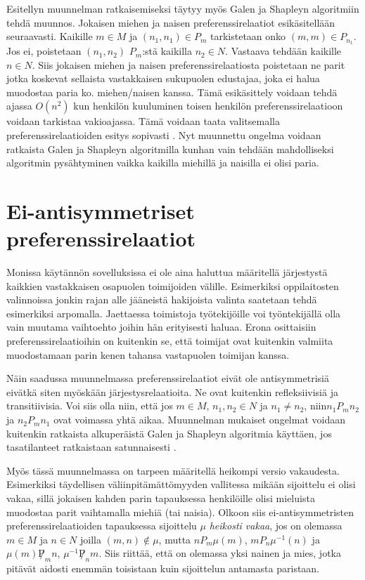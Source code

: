 \documentclass[gradu, twoside]{tktltiki}
\begin{document}
Esitellyn muunnelman ratkaisemiseksi täytyy myös Galen ja Shapleyn
algoritmiin tehdä muunnos. Jokaisen miehen ja naisen
preferenssirelaatiot esikäsitellään seuraavasti. Kaikille $m \in M$ ja
$(n_1, n_1) \in P_m$ tarkistetaan onko $(m, m) \in P_{n_1}$. Jos ei,
poistetaan $(n_1, n_2)$ $P_m$:stä kaikilla $n_2 \in N$. Vastaava
tehdään kaikille $n \in N$. Siis jokaisen miehen ja naisen
preferenssirelaatiosta poistetaan ne parit jotka koskevat sellaista
vastakkaisen sukupuolen edustajaa, joka ei halua muodostaa paria ko.
miehen/naisen kanssa. Tämä esikäsittely voidaan tehdä ajassa $O(n^2)$
kun henkilön kuuluminen toisen henkilön preferenssirelaatioon voidaan
tarkistaa vakioajassa. Tämä voidaan taata valitsemalla
preferenssirelaatioiden esitys sopivasti \cite{gusfield89}. Nyt
muunnettu ongelma voidaan ratkaista Galen ja Shapleyn algoritmilla
kunhan vain tehdään mahdolliseksi algoritmin pysähtyminen vaikka
kaikilla miehillä ja naisilla ei olisi paria.

\section{Ei-antisymmetriset preferenssirelaatiot}

Monissa käytännön sovelluksissa ei ole aina haluttua määritellä
järjestystä kaikkien vastakkaisen osapuolen toimijoiden välille.
Esimerkiksi oppilaitosten valinnoissa jonkin rajan alle jääneistä
hakijoista valinta saatetaan tehdä esimerkiksi arpomalla. Jaettaessa
toimistoja työtekijöille voi työntekijällä olla vain muutama
vaihtoehto joihin hän erityisesti haluaa. Erona osittaisiin
preferenssirelaatioihin on kuitenkin se, että toimijat ovat kuitenkin
valmiita muodostamaan parin kenen tahansa vastapuolen toimijan kanssa.

Näin saadussa muunnelmassa preferenssirelaatiot eivät ole
antisymmetrisiä eivätkä siten myöskään järjestysrelaatioita. Ne ovat
kuitenkin refleksiivisiä ja transitiivisia. Voi siis olla niin, että
jos $m \in M$, $n_1,n_2 \in N$ ja $n_1 \neq n_2$, niin$n_1P_mn_2$ ja
$n_2P_mn_1$ ovat voimassa yhtä aikaa. Muunnelman mukaiset ongelmat
voidaan kuitenkin ratkaista alkuperäistä Galen ja Shapleyn algoritmia
käyttäen, jos tasatilanteet ratkaistaan satunnaisesti
\cite{gusfield89}.

Myös tässä muunnelmassa on tarpeen määritellä heikompi versio
vakaudesta. Esimerkiksi täydellisen väliinpitämättömyyden vallitessa
mikään sijoittelu ei olisi vakaa, sillä jokaisen kahden parin
tapauksessa henkilöille olisi mieluista muodostaa parit vaihtamalla
miehiä (tai naisia). Olkoon siis ei-antisymmetristen
preferenssirelaatioiden tapauksessa sijoittelu $\mu$ \emph{heikosti
  vakaa}, jos on olemassa $m \in M$ ja $n \in N$ joilla $(m, n) \notin
\mu$, mutta $nP_m\mu(m)$, $mP_n\mu^{-1}(n)$ ja $\mu(m)\not P_mn$,
$\mu^{-1}\not P_nm$. Siis riittää, että on olemassa yksi nainen ja
mies, jotka pitävät aidosti enemmän toisistaan kuin sijoittelun
antamasta paristaan.
\end{document}
